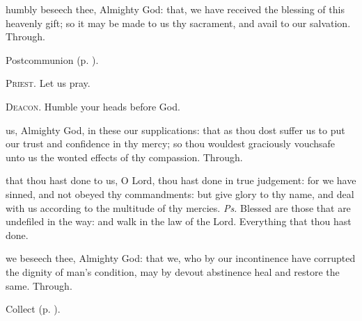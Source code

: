 \vspace{-0.25\baselineskip}

\postcommunion

\vspace{-0.15\baselineskip}

 humbly beseech thee, Almighty God: that, we have received the blessing of this heavenly gift; so it may be made to us thy sacrament, and avail to our salvation. Through.
\begin{rubric}
     Postcommunion  (p. \pageref{AshWednesdayMassPostcommunion}).
\end{rubric}

\textsc{Priest.} Let us pray.\par
\textsc{Deacon.} Humble your heads before God.\par
{} us, Almighty God, in these our supplications: that as thou dost suffer us to put our trust and confidence in thy mercy; so thou wouldest graciously vouchsafe unto us the wonted effects of thy compassion. Through.


\introit
{} that thou hast done to us, O Lord, thou hast done in true judgement: for we have sinned, and not obeyed thy commandments: but give glory to thy name, and deal with us according to the multitude of thy mercies. \textit{Ps.} Blessed are those that are undefiled in the way: and walk in the law of the Lord. Everything that thou hast done.

\vspace{-0.2\baselineskip}

\collect

\vspace{-0.1\baselineskip}

 we beseech thee, Almighty God: that we, who by our incontinence have corrupted the dignity of man's condition, may by devout abstinence heal and restore the same. Through.
\begin{rubric}
     Collect  (p. \pageref{AshWednesdayMassCollect}).
\end{rubric}

